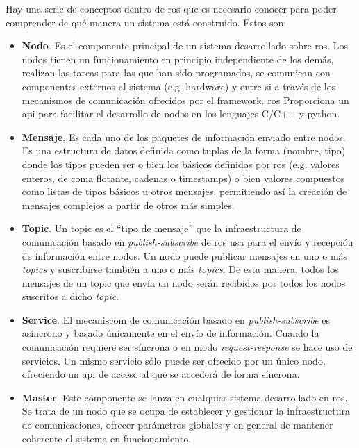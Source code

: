 Hay una serie de conceptos dentro de \ac{ros} que es necesario conocer para poder comprender de qué manera un sistema está construido. Estos son:

\begin{itemize}
	\item \textbf{Nodo}. Es el componente principal de un sistema desarrollado sobre \ac{ros}. Los nodos tienen un funcionamiento en principio independiente de los demás, realizan las tareas para las que han sido programados, se comunican con componentes externos al sistema (e.g. hardware) y entre si a través de los mecanismos de comunicación ofrecidos por el \ac{framework}. \ac{ros} Proporciona un \ac{api} para facilitar el desarrollo de nodos en los lenguajes C/C++ y \gls{python}.
	\item \textbf{Mensaje}. Es cada uno de los paquetes de información enviado entre nodos. Es una estructura de datos definida como tuplas de la forma (nombre, tipo) donde los tipos pueden ser o bien los básicos definidos por ros (e.g. valores enteros, de coma flotante, cadenas o timestamps) o bien valores compuestos como listas de tipos básicos u otros mensajes, permitiendo así la creación de mensajes complejos a partir de otros más simples.
	\item \textbf{Topic}. Un topic es el \enquote{tipo de mensaje} que la infraestructura de comunicación basado en \textit{publish-subscribe} de \ac{ros} usa para el envío y recepción de información entre nodos. Un nodo puede publicar mensajes en uno o más \textit{topics} y suscribirse también a uno o más \textit{topics}. De esta manera, todos los mensajes de un topic que envía un nodo serán recibidos por todos los nodos suscritos a dicho \textit{topic}.
	\item \textbf{Service}. El mecaniscom de comunicación basado en \textit{publish-subscribe} es asíncrono y basado únicamente en el envío de información. Cuando la comunicación requiere ser síncrona o en modo \textit{request-response} se hace uso de servicios. Un mismo servicio sólo puede ser ofrecido por un único nodo, ofreciendo un \ac{api} de acceso al que se accederá de forma síncrona.
	\item \textbf{Master}. Este componente se lanza en cualquier sistema desarrollado en \ac{ros}. Se trata de un nodo que se ocupa de establecer y gestionar la infraestructura de comunicaciones, ofrecer parámetros globales y en general de mantener coherente el sistema en funcionamiento.
\end{itemize}